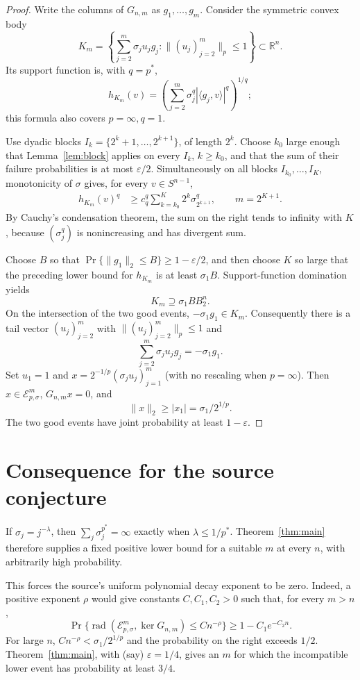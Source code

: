 \documentclass[11pt]{article}
\newcommand{\R}{\mathbb R}
\newcommand{\E}{\mathcal E}
\newcommand{\rad}{\operatorname{rad}}
\newcommand{\ip}[2]{\langle #1,#2\rangle}
\begin{document}
\begin{proof}
Write the columns of $G_{n,m}$ as $g_1,\ldots,g_m$.  Consider the symmetric convex body
\[
 K_m=\left\{\sum_{j=2}^m \sigma_j u_jg_j:
       \|(u_j)_{j=2}^m\|_p\leq1\right\}\subset\R^n.
\]
Its support function is, with $q=p^*$,
\[
 h_{K_m}(v)=
 \left(\sum_{j=2}^m\sigma_j^q|\ip{g_j}{v}|^q\right)^{1/q};
\]
this formula also covers $p=\infty,q=1$.

Use dyadic blocks $I_k=\{2^k+1,\ldots,2^{k+1}\}$, of length $2^k$.  Choose $k_0$ large enough that Lemma~\ref{lem:block} applies on every $I_k$, $k\geq k_0$, and that the sum of their failure probabilities is at most $\varepsilon/2$.  Simultaneously on all blocks $I_{k_0},\ldots,I_K$, monotonicity of $\sigma$ gives, for every $v\in S^{n-1}$,
\begin{align*}
 h_{K_m}(v)^q
 &\geq c_q^q\sum_{k=k_0}^K 2^k\sigma_{2^{k+1}}^q,
 \qquad m=2^{K+1}.
\end{align*}
By Cauchy's condensation theorem, the sum on the right tends to infinity with $K$, because $(\sigma_j^q)$ is nonincreasing and has divergent sum.

Choose $B$ so that $\Pr\{\|g_1\|_2\leq B\}\geq1-\varepsilon/2$, and then choose $K$ so large that the preceding lower bound for $h_{K_m}$ is at least $\sigma_1B$.  Support-function domination yields
\[
 K_m\supseteq \sigma_1B B_2^n.
\]
On the intersection of the two good events, $-\sigma_1g_1\in K_m$.  Consequently there is a tail vector $(u_j)_{j=2}^m$ with $\|(u_j)_{j=2}^m\|_p\leq1$ and
\[
 \sum_{j=2}^m\sigma_ju_jg_j=-\sigma_1g_1.
\]
Set $u_1=1$ and $x=2^{-1/p}(\sigma_ju_j)_{j=1}^m$ (with no rescaling when $p=\infty$).  Then $x\in\E_{p,\sigma}^m$, $G_{n,m}x=0$, and
\[
 \|x\|_2\geq |x_1|=\sigma_1/2^{1/p}.
\]
The two good events have joint probability at least $1-\varepsilon$.
\end{proof}

\section*{Consequence for the source conjecture}
If $\sigma_j=j^{-\lambda}$, then
$\sum_j\sigma_j^{p^*}=\infty$ exactly when $\lambda\leq1/p^*$.  Theorem~\ref{thm:main} therefore supplies a fixed positive lower bound for a suitable $m$ at every $n$, with arbitrarily high probability.

This forces the source's uniform polynomial decay exponent to be zero.  Indeed, a positive exponent $\rho$ would give constants $C,C_1,C_2>0$ such that, for every $m>n$,
\[
 \Pr\{\rad(\E_{p,\sigma}^m,\ker G_{n,m})\leq Cn^{-\rho}\}
 \geq1-C_1e^{-C_2n}.
\]
For large $n$, $Cn^{-\rho}<\sigma_1/2^{1/p}$ and the probability on the right exceeds $1/2$.  Theorem~\ref{thm:main}, with (say) $\varepsilon=1/4$, gives an $m$ for which the incompatible lower event has probability at least $3/4$.
\end{document}
